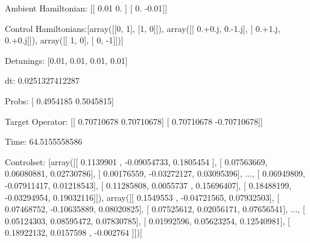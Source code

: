 \documentclass{article}
\begin{document}
    

\newpage

Ambient Hamiltonian: [[ 0.01  0.  ]
 [ 0.   -0.01]]

Control Hamiltonians:[array([[0, 1],
       [1, 0]]), array([[ 0.+0.j,  0.-1.j],
       [ 0.+1.j,  0.+0.j]]), array([[ 1,  0],
       [ 0, -1]])]

Detunings: [0.01, 0.01, 0.01, 0.01]

 dt: 0.0251327412287

Probs: [ 0.4954185  0.5045815]

Target Operator: [[ 0.70710678  0.70710678]
 [ 0.70710678 -0.70710678]]

Time: 64.5155558586

Controlset: [array([[ 0.1139901 , -0.09054733,  0.1805454 ],
       [ 0.07563669,  0.06080881,  0.02730786],
       [ 0.00176559, -0.03272127,  0.03095396],
       ..., 
       [ 0.06949809, -0.07911417,  0.01218543],
       [ 0.11285808,  0.0055737 ,  0.15696407],
       [ 0.18488199, -0.03294954,  0.19032116]]), array([[ 0.1549553 , -0.04721565,  0.07932503],
       [ 0.07468752, -0.10635889,  0.08020825],
       [ 0.07525612,  0.02056171,  0.07656541],
       ..., 
       [ 0.05124303,  0.08595472,  0.07830785],
       [ 0.01992596,  0.05623254,  0.12540981],
       [ 0.18922132,  0.0157598 , -0.002764  ]])]
\end{document}
